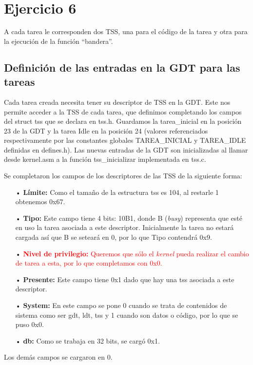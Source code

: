 \section{Ejercicio 6}
\par{A cada tarea le corresponden dos TSS, una para el código de la tarea y otra para la ejecución de la función “bandera”.}

\subsection*{Definición de las entradas en la GDT para las tareas}
\par{Cada tarea creada necesita tener su descriptor de TSS en la GDT. Este nos permite acceder a la TSS de cada tarea, que definimos completando los campos del struct tss que se declara en tss.h. Guardamos la tarea\_inicial en la posición 23 de la GDT y la tarea Idle en la posición 24 (valores referenciados respectivamente por las constantes globales TAREA\_INICIAL y TAREA\_IDLE definidas en defines.h). Las nuevas entradas de la GDT son inicializadas al llamar desde kernel.asm a la función tss\_inicializar implementada en tss.c.}

\par{Se completaron los campos de los descriptores de las TSS de la siguiente forma:}
\begin{itemize}
\item[•] \textbf{Límite:} Como el tamaño de la estructura tss es 104, al restarle 1 obtenemos 0x67.
\item[•] \textbf{Tipo:} Este campo tiene 4 bits: 10B1, donde B (\textit{busy}) representa que esté en uso la tarea asociada a este descriptor. Inicialmente la tarea no estará cargada así que B se seteará en 0, por lo que Tipo contendrá 0x9.
\item[•] \textcolor{red}{\textbf{Nivel de privilegio:} Queremos que sólo el \textit{kernel} pueda realizar el cambio de tarea a esta, por lo que completamos con 0x0.}
\item[•] \textbf{Presente:} Este campo tiene 0x1 dado que hay una tss asociada a este descriptor.
\item[•] \textbf{System:} En este campo se pone 0 cuando se trata de contenidos de sistema como ser gdt, ldt, tss y 1 cuando son datos o código, por lo que se puso 0x0.
\item[•] \textbf{db:} Como se trabaja en 32 bits, se cargó 0x1.
\end{itemize}
\par{Los demás campos se cargaron en 0.}


